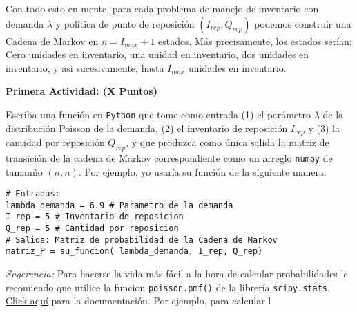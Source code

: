 \documentclass[ a4paper, twoside, 11pt]{article}
\begin{document}
\begin{problem}
Con todo esto en mente, para cada problema de manejo de inventario con demanda $\lambda$ y pol\'itica de punto de reposici\'on $(I_{rep},Q_{rep})$ podemos construir una Cadena de Markov en $n = I_{max} + 1$ estados. M\'as precisamente, los estados ser\'ian: Cero unidades en inventario, una unidad en inventario, dos unidades en inventario, y asi sucesivamente, hasta $I_{max}$ unidades en inventario. 

\textbf{Primera Actividad: (X Puntos)}

Escriba una funci\'on en {\tt Python} que tome como entrada (1) el par\'ametro $\lambda$ de la distribuci\'on Poisson de la demanda, (2) el inventario de reposici\'on $I_{rep}$ y (3) la cantidad por reposici\'on $Q_{rep}$, y que produzca como \'unica salida la matriz de transici\'on de la cadena de Markov correspondiente como un arreglo {\tt numpy} de taman\~no $(n,n)$. Por ejemplo, yo usar\'ia su funci\'on de la siguiente manera:
\halfskip

\begin{center}
\begin{minipage}{0.8\textwidth}
\begin{verbatim}
# Entradas:
lambda_demanda = 6.9 # Parametro de la demanda
I_rep = 5 # Inventario de reposicion
Q_rep = 5 # Cantidad por reposicion
# Salida: Matriz de probabilidad de la Cadena de Markov
matriz_P = su_funcion( lambda_demanda, I_rep, Q_rep)
\end{verbatim}
\end{minipage}
\end{center}
\halfskip

\emph{Sugerencia:} Para hacerse la vida m\'as f\'acil a la hora de calcular probabilidades le recomiendo que utilice la funcion {\tt poisson.pmf()} de la librer\'ia {\tt scipy.stats}. \href{https://docs.scipy.org/doc/scipy/reference/generated/scipy.stats.poisson.html}{Click aqu\'i} para la documentaci\'on. Por ejemplo, para calcular l

\end{problem}
\vspace{\baselineskip}
\end{document}
